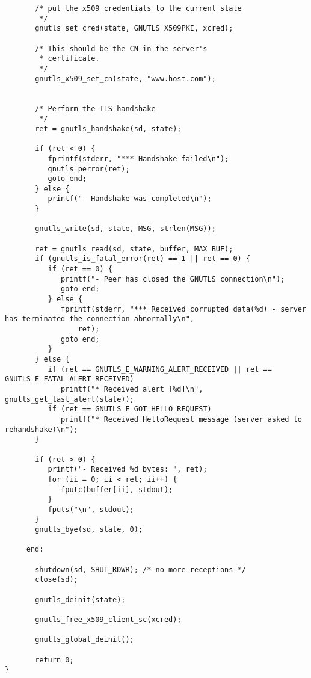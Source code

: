 \begin{verbatim}
       /* put the x509 credentials to the current state
        */
       gnutls_set_cred(state, GNUTLS_X509PKI, xcred);

       /* This should be the CN in the server's 
        * certificate.
        */
       gnutls_x509_set_cn(state, "www.host.com");


       /* Perform the TLS handshake
        */
       ret = gnutls_handshake(sd, state);

       if (ret < 0) {
	      fprintf(stderr, "*** Handshake failed\n");
	      gnutls_perror(ret);
	      goto end;
       } else {
	      printf("- Handshake was completed\n");
       }

       gnutls_write(sd, state, MSG, strlen(MSG));

       ret = gnutls_read(sd, state, buffer, MAX_BUF);
       if (gnutls_is_fatal_error(ret) == 1 || ret == 0) {
	      if (ret == 0) {
		     printf("- Peer has closed the GNUTLS connection\n");
		     goto end;
	      } else {
		     fprintf(stderr, "*** Received corrupted data(%d) - server has terminated the connection abnormally\n",
			     ret);
		     goto end;
	      }
       } else {
	      if (ret == GNUTLS_E_WARNING_ALERT_RECEIVED || ret == GNUTLS_E_FATAL_ALERT_RECEIVED)
		     printf("* Received alert [%d]\n", gnutls_get_last_alert(state));
	      if (ret == GNUTLS_E_GOT_HELLO_REQUEST)
		     printf("* Received HelloRequest message (server asked to rehandshake)\n");
       }

       if (ret > 0) {
	      printf("- Received %d bytes: ", ret);
	      for (ii = 0; ii < ret; ii++) {
		     fputc(buffer[ii], stdout);
	      }
	      fputs("\n", stdout);
       }
       gnutls_bye(sd, state, 0);

     end:

       shutdown(sd, SHUT_RDWR);	/* no more receptions */
       close(sd);

       gnutls_deinit(state);

       gnutls_free_x509_client_sc(xcred);

       gnutls_global_deinit();

       return 0;
}

\end{verbatim}
